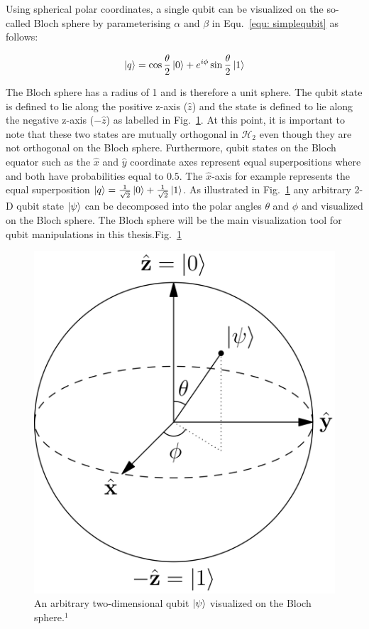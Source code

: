 Using spherical polar coordinates, a single qubit can be visualized on the so-called Bloch sphere by parameterising $\alpha$ and $\beta$ in Equ.~\ref{equ: simplequbit} as follows:

\begin{equation}
\label{equ: blochqubit}
\ket{q} = \cos\frac{\theta}{2} \ket{0} + e^{i \phi} \sin\frac{\theta}{2} \ket{1}
\end{equation}

The Bloch sphere has a radius of 1 and is therefore a unit sphere. The \0 qubit state is defined to lie along the positive z-axis ($\hat{z}$) and the \1 state is defined to lie along the negative z-axis ($-\hat{z}$) as labelled in Fig.~\ref{fig:blochsphere}. At this point, it is important to note that these two states are mutually orthogonal in $\mathcal{H}_{2}$ even though they are not orthogonal on the Bloch sphere. Furthermore, qubit states on the Bloch equator such as the $\hat{x}$ and $\hat{y}$ coordinate axes represent equal superpositions where \0 and \1 both have probabilities equal to $0.5$. The $\hat{x}$-axis for example represents the equal superposition $\ket{q} = \frac{1}{\sqrt{2}} \ket{0} + \frac{1}{\sqrt{2}} \ket{1}$. As illustrated in Fig.~\ref{fig:blochsphere} any arbitrary 2-D qubit state $\ket{\psi}$ can be decomposed into the polar angles $\theta$ and $\phi$ and visualized on the Bloch sphere. The Bloch sphere will be the main visualization tool for qubit manipulations in this thesis.Fig.~\ref{fig:blochsphere}

\begin{figure}[!ht]
       \centering
       \includegraphics[scale=0.07]{img/blochsphere.png}
       \caption{\label{fig:blochsphere} An arbitrary two-dimensional qubit $\ket{\psi}$ visualized on the Bloch sphere.$^{1}$}
\end{figure}

